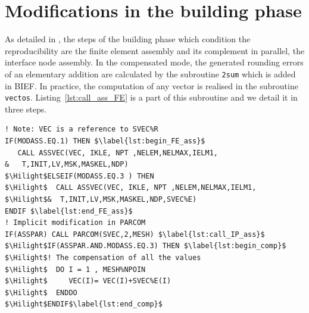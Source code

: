 \section{Modifications in the building phase }
\label{sec:build_implement}
%
As detailed in \cite{LaND16}, the steps of the building
phase which condition the reproducibility
are the finite element assembly and its complement in parallel,
the interface node assembly.
In the compensated mode, the generated rounding errors of an elementary
addition are calculated by the subroutine \texttt{2sum} which is added in BIEF.
In practice, the computation of any vector
is realised in the subroutine \texttt{vectos}.
Listing~\ref{lst:call_ass_FE} is a part of this subroutine and
we detail it in three steps.
%
\begin{lstlisting}[language=TelFortran, caption={The call of the FE assembly under the two modes of the computation in \texttt{vectos}},label={lst:call_ass_FE},escapechar=\$]
! Note: VEC is a reference to SVEC%R
IF(MODASS.EQ.1) THEN $\label{lst:begin_FE_ass}$
   CALL ASSVEC(VEC, IKLE, NPT ,NELEM,NELMAX,IELM1,
&   T,INIT,LV,MSK,MASKEL,NDP)
$\Hilight$ELSEIF(MODASS.EQ.3 ) THEN
$\Hilight$  CALL ASSVEC(VEC, IKLE, NPT ,NELEM,NELMAX,IELM1,
$\Hilight$&  T,INIT,LV,MSK,MASKEL,NDP,SVEC%E)
ENDIF $\label{lst:end_FE_ass}$
! Implicit modification in PARCOM
IF(ASSPAR) CALL PARCOM(SVEC,2,MESH) $\label{lst:call_IP_ass}$
$\Hilight$IF(ASSPAR.AND.MODASS.EQ.3) THEN $\label{lst:begin_comp}$
$\Hilight$! The compensation of all the values
$\Hilight$  DO I = 1 , MESH%NPOIN
$\Hilight$     VEC(I)= VEC(I)+SVEC%E(I)
$\Hilight$  ENDDO
$\Hilight$ENDIF$\label{lst:end_comp}$
\end{lstlisting}
%
